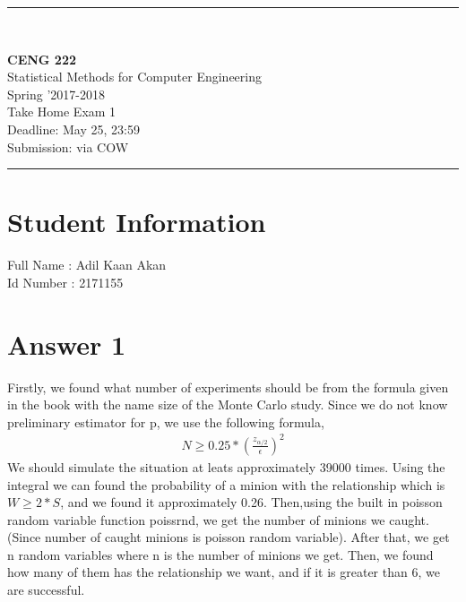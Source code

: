 \documentclass[12pt]{article}
\newcommand{\HRule}{\rule{\linewidth}{1mm}}
\begin{document}
\noindent
\HRule \\[3mm]
\begin{flushright}

                                         \LARGE \textbf{CENG 222}  \\[4mm]
                                         \Large Statistical Methods for Computer Engineering \\[4mm]
                                        \normalsize      Spring '2017-2018 \\
                                           \Large   Take Home Exam 1 \\
                    \normalsize Deadline: May 25, 23:59 \\
                    \normalsize Submission: via COW
\end{flushright}
\HRule

\section*{Student Information }
Full Name :  Adil Kaan Akan\\
Id Number :  2171155\\

\section*{Answer 1}
Firstly, we found what number of experiments should be from the formula given in the book with the name size of the Monte Carlo study. Since we do not know preliminary estimator for p, we use the following formula,\\
\begin{align*}
N \geq 0.25*(\frac{z_{\alpha/2}}{\epsilon})^2
\end{align*}
We should simulate the situation at leats approximately 39000 times.
Using the integral we can found the probability of a minion with the relationship which is $W \geq 2*S$, and we found it approximately 0.26.
Then,using the built in poisson random variable function poissrnd, we get the number of minions we caught.(Since number of caught minions is poisson random variable). After that, we get n random variables where n is the number of minions we get. Then, we found how many of them has the relationship we want, and if it is greater than 6, we are successful.
\end{document}

